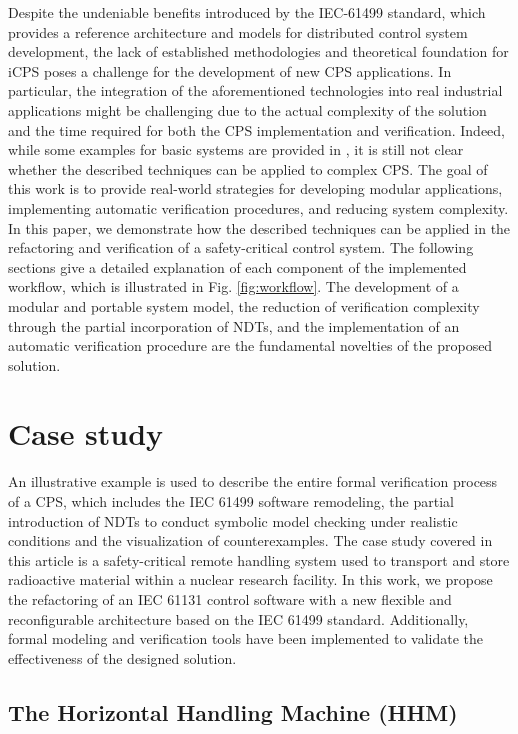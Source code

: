 \begin{bibunit}
Despite the undeniable benefits introduced by the IEC-61499 standard, which provides a reference architecture and models for distributed control system development, the lack of established methodologies and theoretical foundation for iCPS poses a challenge for the development of new CPS applications. 
In particular, the integration of the aforementioned technologies into real industrial applications might be challenging due to the actual complexity of the solution and the time required for both the CPS implementation and verification. 
Indeed, while some examples for basic systems are provided in \cite{xavier2021}, it is still not clear whether the described techniques can be applied to complex CPS. 
The goal of this work is to provide real-world strategies for developing modular applications, implementing automatic verification procedures, and reducing system complexity. In this paper, we demonstrate how the described techniques can be applied in the refactoring and verification of a safety-critical control system.
The following sections give a detailed explanation of each component of the implemented workflow, which is illustrated in Fig. \ref{fig:workflow}.
The development of a modular and portable system model, the reduction of verification complexity through the partial incorporation of NDTs, and the implementation of an automatic verification procedure are the fundamental novelties of the proposed solution.

\section{Case study}
\label{sec:case_study}
An illustrative example is used to describe the entire formal verification process of a CPS, which includes the IEC 61499 software remodeling, the partial introduction of NDTs to conduct symbolic model checking under realistic conditions and the visualization of counterexamples.
The case study covered in this article is a safety-critical remote handling system used to transport and store radioactive material within a nuclear research facility. 
In this work, we propose the refactoring of an IEC 61131 control software with a new flexible and reconfigurable architecture based on the IEC 61499 standard. Additionally, formal modeling and verification tools have been implemented to validate the effectiveness of the designed solution.

\subsection{The Horizontal Handling Machine (HHM)}


\end{bibunit}
